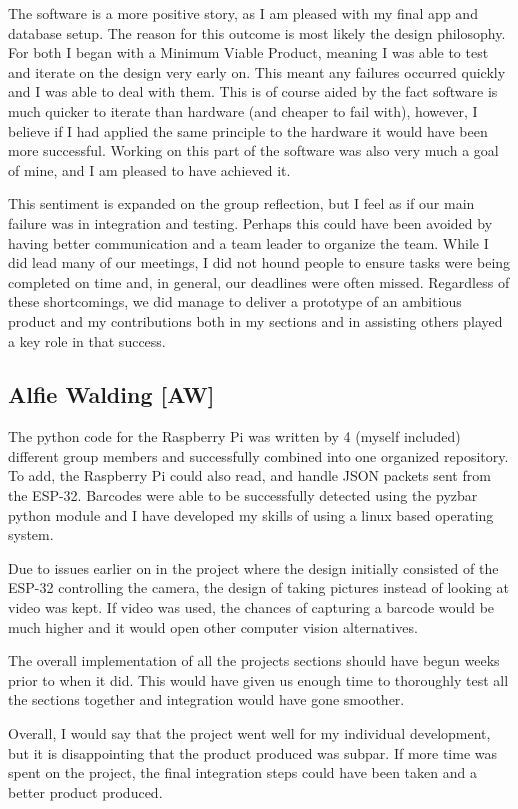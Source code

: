 The software is a more positive story, as I am pleased with my final app and database setup.
The reason for this outcome is most likely the design philosophy.
For both I began with a Minimum Viable Product, meaning I was able to test and iterate on the design very early on.
This meant any failures occurred quickly and I was able to deal with them.
This is of course aided by the fact software is much quicker to iterate than hardware (and cheaper to fail with), however, I believe if I had applied the same principle to the hardware it would have been more successful.
Working on this part of the software was also very much a goal of mine, and I am pleased to have achieved it.

This sentiment is expanded on the group reflection, but I feel as if our main failure was in integration and testing.
Perhaps this could have been avoided by having better communication and a team leader to organize the team.
While I did lead many of our meetings, I did not hound people to ensure tasks were being completed on time and, in general, our deadlines were often missed.
Regardless of these shortcomings, we did manage to deliver a prototype of an ambitious product
and my contributions both in my sections and in assisting others played a key role in that success.

\subsection{Alfie Walding [AW]}
The python code for the Raspberry Pi was written by 4 (myself included) different group members and successfully combined into one organized repository.
To add, the Raspberry Pi could also read, and handle JSON packets sent from the ESP-32.
Barcodes were able to be successfully detected using the pyzbar python module and I have developed my skills of using a linux based operating system.

Due to issues earlier on in the project where the design initially consisted of the ESP-32 controlling the camera, the design of taking pictures instead of looking at video was kept.
If video was used, the chances of capturing a barcode would be much higher and it would open other computer vision alternatives.

The overall implementation of all the projects sections should have begun weeks prior to when it did.
This would have given us enough time to thoroughly test all the sections together and integration would have gone smoother.

Overall, I would say that the project went well for my individual development, but it is disappointing that the product produced was subpar.
If more time was spent on the project, the final integration steps could have been taken and a better product produced.

